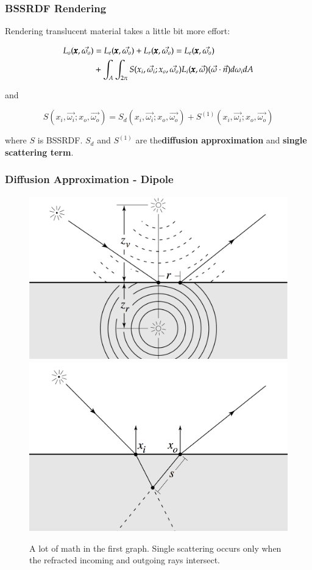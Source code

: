 \begin{frame}
  \frametitle{BSSRDF Rendering}
Rendering translucent material takes a little bit more effort:

  \begin{align*}
L_o(\pmb{x}, \vec{\omega_o}) &= L_e(\pmb{x}, \vec{\omega_o}) + L_r(\pmb{x}, \vec{\omega_o}) = L_e(\pmb{x}, \vec{\omega_o})\\
         & + \int_A\int_{2\pi}S(x_i, \vec{\omega_i}; x_o,
           \vec{\omega_o})L_i(\pmb{x}, \vec{\omega})(\vec{\omega}\cdot\vec{n})d\omega_idA
  \end{align*}

and

$$
S(x_i, \vec{\omega_i}; x_o, \vec{\omega_o})  = S_d(x_i,
\vec{\omega_i}; x_o, \vec{\omega_o}) +S^{(1)}(x_i, \vec{\omega_i};
x_o, \vec{\omega_o})
$$

where $S$ is BSSRDF. $S_d$ and $S^{(1)}$ are the{\bf  diffusion approximation} and
{\bf single scattering term}.

\end{frame}


\begin{frame}

\frametitle{Diffusion Approximation - Dipole}
  \begin{figure}[!ht]
    \centering
    \includegraphics[scale=0.15]{di.png}
    \hspace{4mm}
    \includegraphics[scale=0.15]{single.png}
    \caption{A lot of math in the first graph. Single scattering occurs only when the refracted incoming and outgoing rays intersect.}
  \end{figure}
\end{frame}


